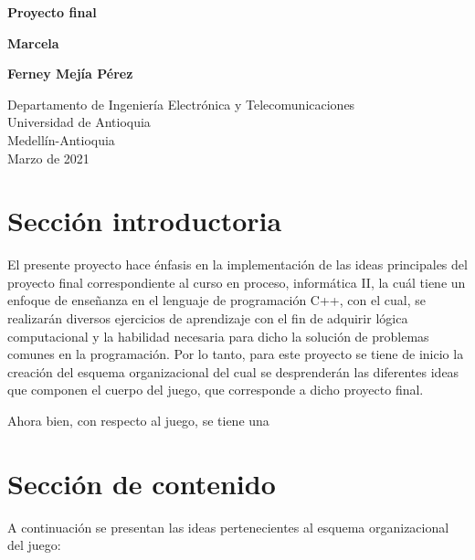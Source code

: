 \documentclass{article}
\begin{document}
\begin{titlepage}
    \begin{center}
        \vspace*{1cm}
            
        \Huge
        \textbf{Proyecto final}
            
        \vspace{0.5cm}
        \LARGE
            
            
        \vspace{1.5cm}
        
        \textbf{Marcela} 
        
        \textbf{Ferney Mejía Pérez}
            
        \vfill
            
        \vspace{0.8cm}
            
        \Large
        Departamento de Ingeniería Electrónica y Telecomunicaciones\\
        Universidad de Antioquia\\
        Medellín-Antioquia\\
        Marzo de 2021
            
    \end{center}
\end{titlepage}

\tableofcontents
\newpage
\section{Sección introductoria}\label{intro}
El presente proyecto hace énfasis en la implementación de las ideas principales del proyecto final correspondiente al curso en proceso, informática II, la cuál tiene un enfoque de enseñanza en el lenguaje de programación C++, con el cual, se realizarán diversos ejercicios de aprendizaje con el fin de adquirir lógica computacional y la habilidad necesaria para dicho la solución de problemas comunes en la programación. Por lo tanto, para este proyecto se tiene de inicio la creación del esquema organizacional del cual se desprenderán las diferentes ideas que componen el cuerpo del juego, que corresponde a dicho proyecto final.

Ahora bien, con respecto al juego, se tiene una
\section{Sección de contenido} \label{contenido}
A continuación se presentan las ideas pertenecientes al esquema organizacional del juego:
\end{document}
